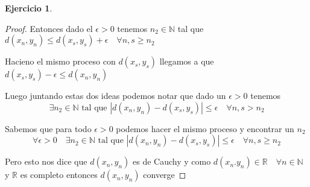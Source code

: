 \documentclass[12pt]{article}
\newcommand{\R}{\mathbb{R}}
\newcommand{\N}{\mathbb{N}}
\theoremstyle{definition}
\newtheorem{ej}{Ejercicio}
\begin{document}
\begin{ej}
\begin{enumerate}
\begin{proof}
	Entonces dado el $\epsilon >0$ tenemos $n_2 \in \N$ tal que $d(x_n,y_n) \leq d(x_s,y_s) + \epsilon \quad \forall n,s \geq n_2$

	Hacieno el mismo proceso con $d(x_s,y_s)$ llegamos a que $d(x_s,y_s) - \epsilon \leq d(x_n,y_n)$
      
     Luego juntando estas dos ideas podemos notar que dado un $\epsilon > 0$ tenemos
     $$\exists n_2 \in \N \text{ tal que } |d(x_n,y_n) - d(x_s,y_s)| \leq \epsilon \quad \forall n,s > n_2$$ 

   Sabemos que para todo $\epsilon > 0$ podemos hacer el mismo proceso y encontrar un $n_2$ 
 $$\forall \epsilon > 0 \quad \exists n_2 \in \N \text{ tal que } |d(x_n,y_n) - d(x_s,y_s)| \leq \epsilon \quad \forall n,s \geq n_2$$ 


     Pero esto nos dice que $d(x_n,y_n)$ es de Cauchy y como $d(x_n.y_n) \in \R \quad \forall n \in \N$ y $\R$ es completo entonces $d(x_n,y_n)$ converge

      \end{proof}
  \end{enumerate}
\end{ej}
\end{document}
